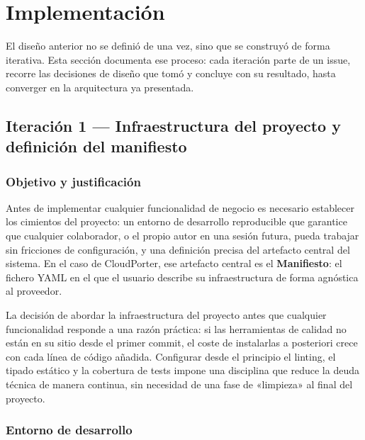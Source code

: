 \section{Implementación}

El diseño anterior no se definió de una vez, sino que se construyó de forma iterativa. Esta
sección documenta ese proceso: cada iteración parte de un issue, recorre las decisiones de diseño
que tomó y concluye con su resultado, hasta converger en la arquitectura ya presentada.

\subsection{Iteración 1 — Infraestructura del proyecto y definición del manifiesto}
\label{sec:iter1}

\subsubsection{Objetivo y justificación}

Antes de implementar cualquier funcionalidad de negocio es necesario establecer los cimientos
del proyecto: un entorno de desarrollo reproducible que garantice que cualquier colaborador, o
el propio autor en una sesión futura, pueda trabajar sin fricciones de configuración, y una
definición precisa del artefacto central del sistema. En el caso de CloudPorter, ese artefacto
central es el \textbf{Manifiesto}: el fichero YAML en el que el usuario describe su infraestructura
de forma agnóstica al proveedor.

La decisión de abordar la infraestructura del proyecto antes que cualquier funcionalidad
responde a una razón práctica: si las herramientas de calidad no están en su sitio desde el
primer commit, el coste de instalarlas a posteriori crece con cada línea de código añadida.
Configurar desde el principio el linting, el tipado estático y la cobertura de tests impone
una disciplina que reduce la deuda técnica de manera continua, sin necesidad de una fase de
«limpieza» al final del proyecto.

\subsubsection{Entorno de desarrollo}

